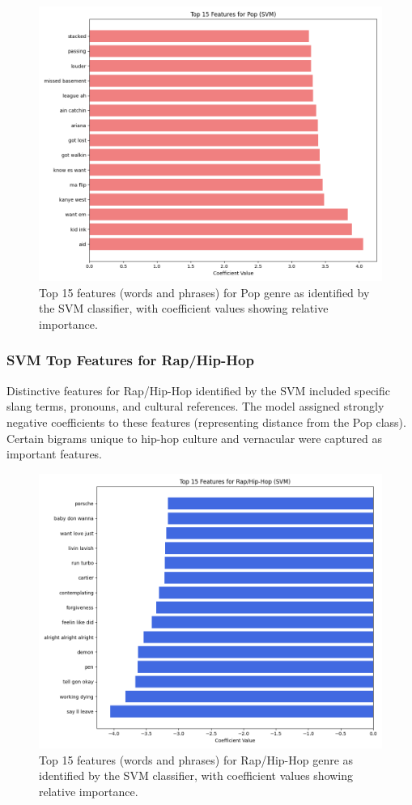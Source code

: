 \documentclass[conference]{IEEEtran}
\begin{document}
\begin{figure}[htbp]
\centerline{\includegraphics[width=0.9\columnwidth]{plots/svm_top_features_pop.png}}
\caption{Top 15 features (words and phrases) for Pop genre as identified by the SVM classifier, with coefficient values showing relative importance.}
\label{fig:pop_features}
\end{figure}

\subsubsection{SVM Top Features for Rap/Hip-Hop}
Distinctive features for Rap/Hip-Hop identified by the SVM included specific slang terms, pronouns, and cultural references. The model assigned strongly negative coefficients to these features (representing distance from the Pop class). Certain bigrams unique to hip-hop culture and vernacular were captured as important features.

\begin{figure}[htbp]
\centerline{\includegraphics[width=0.9\columnwidth]{plots/svm_top_features_rap_hip-hop.png}}
\caption{Top 15 features (words and phrases) for Rap/Hip-Hop genre as identified by the SVM classifier, with coefficient values showing relative importance.}
\label{fig:rap_features}
\end{figure}
\end{document}
